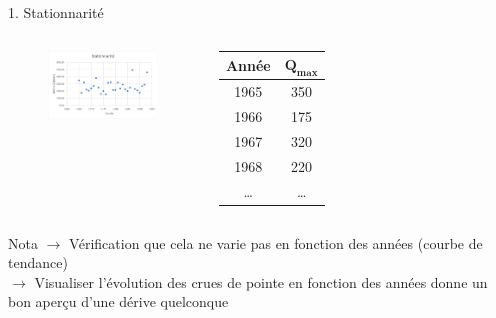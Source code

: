\documentclass{beamer}
\begin{document}
\begin{frame}{1. Stationnarité}
    \begin{columns}
        \begin{figure}
            \centering
            \includegraphics[width=5cm]{stationnarite.png}
        \end{figure}
        \begin{tabular}{c|c}
            \toprule
            \textbf{Année} & $\mathbf{Q_{max}}$ \\
            \midrule
            1965 & 350 \\
            1966 & 175 \\
            1967 & 320 \\
            1968 & 220 \\
            \dots & \dots \\
            \bottomrule
        \end{tabular}        
    \end{columns}
    \begin{exampleblock}{Nota}
        $\rightarrow$ Vérification que cela ne varie pas en fonction des années (courbe de tendance) \\
        $\rightarrow$ Visualiser l'évolution des crues de pointe en fonction des années donne un bon aperçu d'une dérive quelconque
      \end{exampleblock}
\end{frame}
\end{document}
